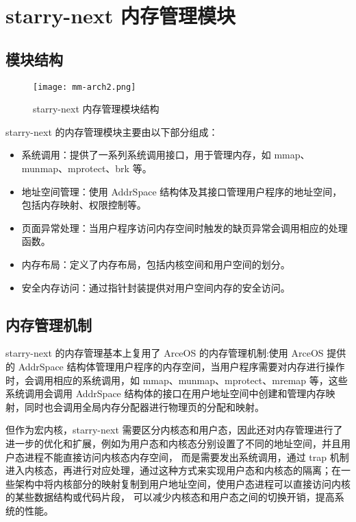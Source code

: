 \section{starry-next 内存管理模块}

\subsection{模块结构}

\begin{figure}[H]
    \centering
    \texttt{[image: mm-arch2.png]}
    \caption{starry-next 内存管理模块结构}
    \label{fig:mm-arch}
\end{figure}

starry-next 的内存管理模块主要由以下部分组成：

\begin{itemize}
    \item 系统调用：提供了一系列系统调用接口，用于管理内存，如 mmap、munmap、mprotect、brk 等。
    \item 地址空间管理：使用 AddrSpace 结构体及其接口管理用户程序的地址空间，包括内存映射、权限控制等。
    \item 页面异常处理：当用户程序访问内存空间时触发的缺页异常会调用相应的处理函数。
    \item 内存布局：定义了内存布局，包括内核空间和用户空间的划分。
    \item 安全内存访问：通过指针封装提供对用户空间内存的安全访问。
\end{itemize}

\subsection{内存管理机制}

starry-next 的内存管理基本上复用了 ArceOS 的内存管理机制:使用 ArceOS 提供的 AddrSpace 结构体管理用户程序的内存空间，当用户程序需要对内存进行操作时，会调用相应的系统调用，如 mmap、munmap、mprotect、mremap 等，这些系统调用会调用 AddrSpace 结构体的接口在用户地址空间中创建和管理内存映射，同时也会调用全局内存分配器进行物理页的分配和映射。

但作为宏内核，starry-next 需要区分内核态和用户态，因此还对内存管理进行了进一步的优化和扩展，例如为用户态和内核态分别设置了不同的地址空间，并且用户态进程不能直接访问内核态内存空间，
而是需要发出系统调用，通过 trap 机制进入内核态，再进行对应处理，通过这种方式来实现用户态和内核态的隔离；在一些架构中将内核部分的映射复制到用户地址空间，使用户态进程可以直接访问内核的某些数据结构或代码片段，
可以减少内核态和用户态之间的切换开销，提高系统的性能。

